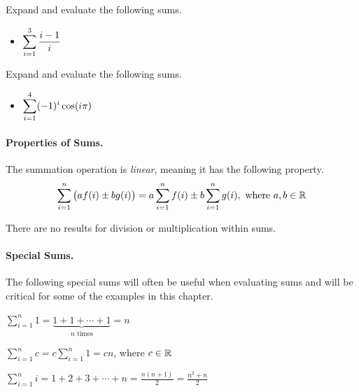 \documentclass[12pt]{article}
\begin{document}
\vspace{20mm}

\Example Expand and evaluate the following sums.


\begin{itemize}
\item[\tc{1}] $\displaystyle\sum_{i=1}^3\frac{i-1}{i}$
\end{itemize}

\newpage

\ExampleCont Expand and evaluate the following sums.

\begin{itemize}
	\item[\tc{2}] $\displaystyle\sum_{i=1}^{4}(-1)^i\cos(i\pi)$
\end{itemize}

\vspace{15mm}

\paragraph{Properties of Sums.} The summation operation is \textit{linear}, meaning it has the following property.
$$\sum_{i=1}^{n}\big( af(i)\pm bg(i)\big)=a\sum_{i=1}^n f(i)\pm b\sum_{i=1}^n g(i),\text{ where }a,b\in\mathbb{R}$$

\vspace{3mm}

There are no results for division or multiplication within sums.

\vspace{5mm}

\paragraph{Special Sums.} The following special sums will often be useful when evaluating sums and will be critical for some of the examples in this chapter.

\vspace{5mm}

$\displaystyle\sum_{i=1}^{n}1=\underbrace{1+1+\cdots+1}_{n\text{ times}}=n$

\vspace{5mm}

$\displaystyle\sum_{i=1}^{n}c=c\sum_{i=1}^{n}1=cn$, where $c\in\mathbb{R}$

\vspace{5mm}

$\displaystyle\sum_{i=1}^{n}i=1+2+3+\cdots+n=\frac{n(n+1)}{2}=\frac{n^2+n}{2}$
\end{document}
